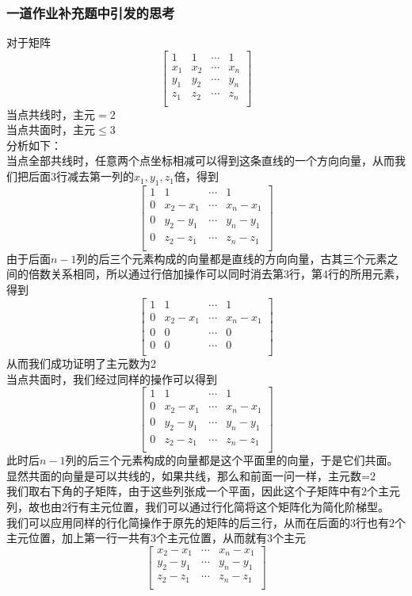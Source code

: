\documentclass{article}
\begin{document}
\begin{CJK}{UTF8}{gkai}
\subsubsection*{一道作业补充题中引发的思考}
对于矩阵
\[\begin{bmatrix}
    1&1&\cdots&1\\
    x_1&x_2&\cdots&x_n\\
    y_1&y_2&\cdots&y_n\\
    z_1&z_2&\cdots&z_n\\
\end{bmatrix}\]
当点共线时，主元$=2$\\
当点共面时，主元$\leq 3$\\
分析如下：\\
当点全部共线时，任意两个点坐标相减可以得到这条直线的一个方向向量，从而我们把后面$3$行减去第一列的$x_1,y_1,z_1$倍，得到\\
\[\begin{bmatrix}
    1&1&\cdots&1\\
    0&x_2-x_1&\cdots&x_n-x_1\\
    0&y_2-y_1&\cdots&y_n-y_1\\
    0&z_2-z_1&\cdots&z_n-z_1\\
\end{bmatrix}\]
由于后面$n-1$列的后三个元素构成的向量都是直线的方向向量，古其三个元素之间的倍数关系相同，所以通过行倍加操作可以同时消去第3行，第4行的所用元素，得到
\[\begin{bmatrix}
    1&1&\cdots&1\\
    0&x_2-x_1&\cdots&x_n-x_1\\
    0&0&\cdots&0\\
    0&0&\cdots&0\\
\end{bmatrix}\]
从而我们成功证明了主元数为2\\

当点共面时，我们经过同样的操作可以得到
\[\begin{bmatrix}
    1&1&\cdots&1\\
    0&x_2-x_1&\cdots&x_n-x_1\\
    0&y_2-y_1&\cdots&y_n-y_1\\
    0&z_2-z_1&\cdots&z_n-z_1\\
\end{bmatrix}\]
此时后$n-1$列的后三个元素构成的向量都是这个平面里的向量，于是它们共面。\\
显然共面的向量是可以共线的，如果共线，那么和前面一问一样，主元数=$2$\\
我们取右下角的子矩阵，由于这些列张成一个平面，因此这个子矩阵中有$2$个主元列，故也由$2$行有主元位置，我们可以通过行化简将这个矩阵化为简化阶梯型。\\
我们可以应用同样的行化简操作于原先的矩阵的后三行，从而在后面的$3$行也有$2$个主元位置，加上第一行一共有$3$个主元位置，从而就有$3$个主元
\[\begin{bmatrix}
    x_2-x_1&\cdots&x_n-x_1\\
    y_2-y_1&\cdots&y_n-y_1\\
    z_2-z_1&\cdots&z_n-z_1\\
\end{bmatrix}\]


\end{CJK}
\end{document}

